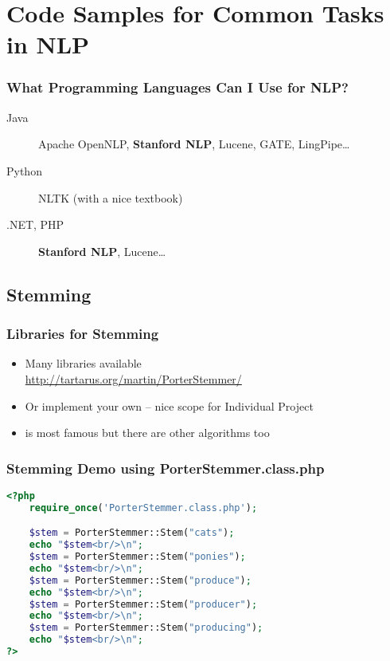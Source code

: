 \section{Code Samples for Common Tasks in NLP}

\begin{frame}
\frametitle{What Programming Languages Can I Use for NLP?}
    
\begin{description}
\item[Java] Apache OpenNLP, \textbf<2>{Stanford NLP}, Lucene, GATE, LingPipe\ldots
\item[Python] NLTK (with a nice textbook)
\item[.NET, PHP] \textbf<2>{Stanford NLP}, Lucene\ldots
\end{description}



\end{frame}


\subsection{Stemming}

\begin{frame}
\frametitle{Libraries for Stemming}
    
\begin{itemize}
\item Many libraries available \\\url{http://tartarus.org/martin/PorterStemmer/}
\item Or implement your own -- nice scope for Individual Project
\item \textcite{porter:1980} is most famous but there are other algorithms too
\end{itemize}

\end{frame}

\begin{frame}
\frametitle{Stemming Demo using PorterStemmer.class.php}
    
\begin{lstlisting}[language=PHP]
<?php
    require_once('PorterStemmer.class.php');

    $stem = PorterStemmer::Stem("cats");
    echo "$stem<br/>\n";
    $stem = PorterStemmer::Stem("ponies");
    echo "$stem<br/>\n";
    $stem = PorterStemmer::Stem("produce");
    echo "$stem<br/>\n";
    $stem = PorterStemmer::Stem("producer");
    echo "$stem<br/>\n";
    $stem = PorterStemmer::Stem("producing");
    echo "$stem<br/>\n";
?>
\end{lstlisting}
\end{frame}

